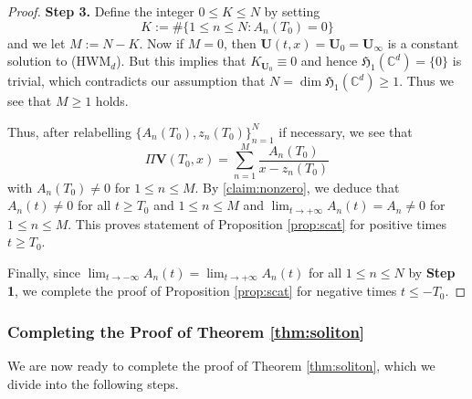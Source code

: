 \documentclass[11pt,reqno]{amsart}
\theoremstyle{definition}
\theoremstyle{remark}
\theoremstyle{remark}
\numberwithin{equation}{section}
\newcommand{\Hfr}{\mathfrak{H}}
\newcommand{\C}{\mathbb{C}}
\newcommand{\Vb}{\mathbf{V}}
\newcommand{\Ub}{\mathbf{U}}
\begin{document}
\begin{proof}
 \medskip
 {\bf Step 3.} Define the integer $0 \leq K \leq N$ by  setting 
 $$
 K := \# \{ 1 \leq n \leq N : A_n(T_0) = 0\}
 $$ 
 and we let $M := N-K$. Now if $M=0$, then $\Ub(t,x) = \Ub_0 = \Ub_\infty$ is a constant solution to (HWM$_d$). But this implies that $K_{\Ub_0} \equiv 0$ and hence $\Hfr_1(\C^d) = \{ 0 \}$ is trivial, which contradicts our assumption that $N = \dim \Hfr_1(\C^d) \geq 1$. Thus we see that $M \geq 1$ holds. 
 
 Thus, after relabelling $\{ A_n(T_0), z_n(T_0) \}_{n=1}^N$ if necessary, we see that
 $$
 \Pi \Vb(T_0, x) = \sum_{n=1}^M \frac{A_n(T_0)}{x-z_n(T_0)} 
 $$
 with $A_n(T_0) \neq 0$ for $1 \leq n \leq M$. By \eqref{claim:nonzero}, we deduce that $A_n(t) \neq 0$ for all $t \geq T_0$ and $1 \leq n \leq M$ and $\lim_{t \to +\infty} A_n(t) = A_n \neq 0$ for $1 \leq n \leq M$. This proves statement of Proposition \ref{prop:scat} for positive times $t \geq T_0$.
 
 Finally, since $\lim_{t \to -\infty} A_n(t) = \lim_{t \to +\infty} A_n(t)$ for all $1 \leq n \leq N$ by \textbf{Step 1}, we complete the proof of Proposition \ref{prop:scat} for negative times $t \leq -T_0$.
 \end{proof}
 
 \subsubsection*{Completing the Proof of Theorem \ref{thm:soliton}}
 We are now ready to complete the proof of Theorem \ref{thm:soliton}, which we divide into the following steps.
 
\end{document}

